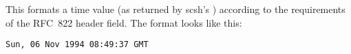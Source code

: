 \begin{desc}
  This formats a time value (as returned by scsh's )
  according to the requirements of the RFC~822  header
  field.  The format looks like this:
%
\begin{verbatim}
Sun, 06 Nov 1994 08:49:37 GMT
\end{verbatim}
\end{desc}


